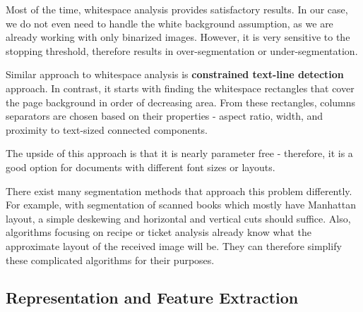 \begin{description}
Most of the time, whitespace analysis provides satisfactory results. In our case, we do not even need to handle the white background assumption, as we are already working with only binarized images. However, it is very sensitive to the stopping threshold, therefore results in over-segmentation or under-segmentation.

\item Similar approach to whitespace analysis is \textbf{constrained text-line detection} approach. In contrast, it starts with finding the whitespace rectangles that cover the page background in order of decreasing area. From these rectangles, columns separators are chosen based on their properties - aspect ratio, width, and proximity to text-sized connected components.

The upside of this approach is that it is nearly parameter free - therefore, it is a good option for documents with different font sizes or layouts.

\end{description}

There exist many segmentation methods that approach this problem differently. For example, with segmentation of scanned books which mostly have Manhattan layout, a simple deskewing and horizontal and vertical cuts should suffice. Also, algorithms focusing on recipe or ticket analysis already know what the approximate layout of the received image will be. They can therefore simplify these complicated algorithms for their purposes.

\subsection{Representation and Feature Extraction}

